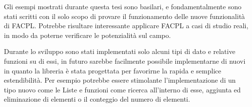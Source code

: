 Gli esempi mostrati durante questa tesi sono basilari, e fondamentalmente sono stati scritti con il solo scopo di provare il funzionamento delle nuove funzionalità di \ac{FACPL}. Potrebbe risultare interessante applicare \ac{FACPL} a casi di studio reali, in modo da poterne verificare le potenzialità sul campo.\par
Durante lo sviluppo sono stati implementati solo alcuni tipi di dato e relative funzioni su di essi, in futuro sarebbe facilmente possibile implementarne di nuovi in quanto la libreria è stata
progettata per favorirne la rapida e semplice estendibilità. Per esempio potrebbe essere stimolante l'implementazione di un tipo nuovo come le Liste e funzioni come ricerca all'interno di esse, aggiunta ed eliminazione di elementi o il conteggio del numero di elementi.